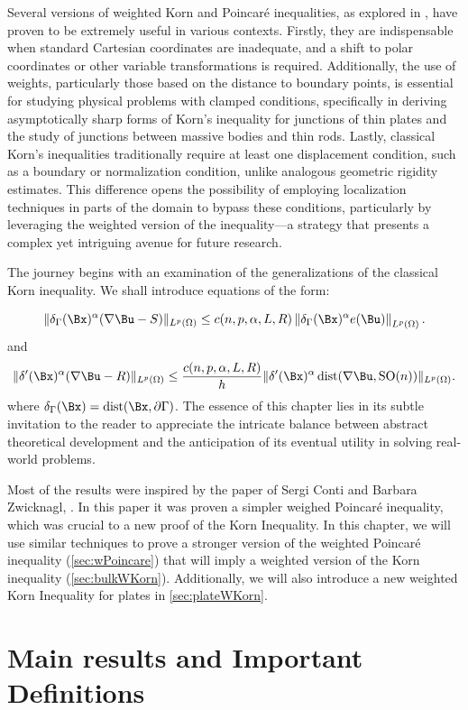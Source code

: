 Several versions of weighted Korn and Poincaré inequalities, as explored in \cite{wKorn1,wKorn2,wKorn3,surveyQuasilinearSystems}, have proven to be extremely useful in various contexts. Firstly, they are indispensable when standard Cartesian coordinates are inadequate, and a shift to polar coordinates or other variable transformations is required. Additionally, the use of weights, particularly those based on the distance to boundary points, is essential for studying physical problems with clamped conditions, specifically in deriving asymptotically sharp forms of Korn’s inequality for junctions of thin plates and the study of junctions between massive bodies and thin rods. Lastly, classical Korn’s inequalities traditionally require at least one displacement condition, such as a boundary or normalization condition, unlike analogous geometric rigidity estimates. This difference opens the possibility of employing localization techniques in parts of the domain to bypass these conditions, particularly by leveraging the weighted version of the inequality—a strategy that presents a complex yet intriguing avenue for future research.


The journey begins with an examination of the generalizations of the classical Korn inequality. We shall introduce equations of the form:

$$
\|\delta_\GG(\Bx)^\alpha(\nabla \Bu-S)\|_{L^p(\Omega)} \leq  c(n,p,\alpha,L,R)\left\|\delta_\GG(\Bx)^\alpha e(\Bu)\right\|_{L^p(\Omega)}.
$$
and
$$
\|\delta'(\Bx)^\alpha(\nabla \Bu-R)\|_{L^p(\Omega)} \leq \frac{c(n,p,\alpha,L,R)}{h}\|\delta'(\Bx)^\alpha\operatorname{dist}(\nabla \Bu, \operatorname{SO}(n))\|_{L^p(\Omega)}.
$$
where  $\delta_\GG(\Bx)=\dist(\Bx, \partial\GG)$. The essence of this chapter lies in its subtle invitation to the reader to appreciate the intricate balance between abstract theoretical development and the anticipation of its eventual utility in solving real-world problems.

Most of the results were inspired by the paper of Sergi Conti and Barbara Zwicknagl, \cite{conti0}. In this paper it was proven a simpler weighed Poincaré inequality, which was crucial to a new proof of the Korn Inequality. In this chapter, we will use similar techniques to prove a stronger version of the weighted Poincaré inequality (\ref{sec:wPoincare}) that will imply a weighted version of the Korn inequality (\ref{sec:bulkWKorn}). Additionally, we will also introduce a new weighted Korn Inequality for plates in \ref{sec:plateWKorn}.

\section{Main results and Important Definitions}
\label{sec:mainWKorn}

